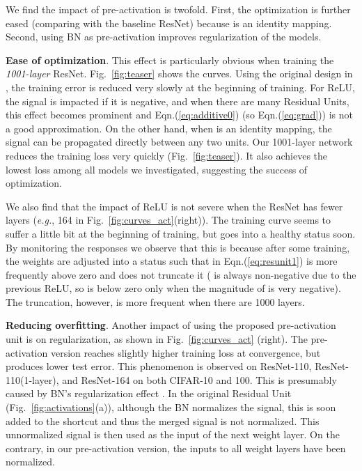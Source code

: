 \documentclass[runningheads]{llncs}
\def\eg{\emph{e.g.}}
\begin{document}
We find the impact of pre-activation is twofold. First, the optimization is further eased (comparing with the baseline ResNet) because  is an identity mapping. Second, using BN as pre-activation improves regularization of the models.

\textbf{Ease of optimization}. This effect is particularly obvious when training the \emph{1001-layer} ResNet. Fig.~\ref{fig:teaser} shows the curves. Using the original design in \cite{He2016}, the training error is reduced very slowly at the beginning of training. For  ReLU, the signal is impacted if it is negative, and when there are many Residual Units, this effect becomes prominent and Eqn.(\ref{eq:additive0}) (so Eqn.(\ref{eq:grad})) is not a good approximation. On the other hand, when  is an identity mapping, the signal can be propagated directly between any two units. Our 1001-layer network reduces the training loss very quickly (Fig.~\ref{fig:teaser}). It also achieves the lowest loss among all models we investigated, suggesting the success of optimization.

We also find that the impact of  ReLU is not severe when the ResNet has fewer layers (\eg, 164 in Fig.~\ref{fig:curves_act}(right)). The training curve seems to suffer a little bit at the beginning of training, but goes into a healthy status soon. By monitoring the responses we observe that this is because after some training, the weights are adjusted into a status such that  in Eqn.(\ref{eq:resunit1}) is more frequently above zero and  does not truncate it ( is always non-negative due to the previous ReLU, so  is below zero only when the magnitude of  is very negative). The truncation, however, is more frequent when there are 1000 layers.

\textbf{Reducing overfitting}. Another impact of using the proposed pre-activation unit is on regularization, as shown in Fig.~\ref{fig:curves_act} (right). The pre-activation version reaches slightly higher training loss at convergence, but produces lower test error. This phenomenon is observed on ResNet-110, ResNet-110(1-layer), and ResNet-164 on both CIFAR-10 and 100. This is presumably caused by BN's regularization effect \cite{Ioffe2015}. In the original Residual Unit (Fig.~\ref{fig:activations}(a)), although the BN normalizes the signal, this is soon added to the shortcut and thus the merged signal is not normalized. This unnormalized signal is then used as the input of the next weight layer. On the contrary, in our pre-activation version, the inputs to all weight layers have been normalized.
\end{document}
